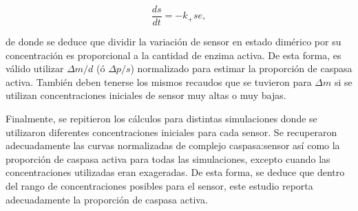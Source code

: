 \begin{equation}
    \frac{ds}{dt} = - k_+ se,
\end{equation}

\noindent de donde se deduce que dividir la variación de sensor en estado dimérico por su concentración es proporcional a la cantidad de enzima activa. De esta forma, es válido utilizar $\Delta m/d$ (ó $\Delta p/s$) normalizado para estimar la proporción de caspasa activa. También deben tenerse los mismos recaudos que se tuvieron para $\Delta m$ si se utilizan concentraciones iniciales de sensor muy altas o muy bajas.

Finalmente, se repitieron los cálculos para distintas simulaciones donde se utilizaron diferentes concentraciones iniciales para cada sensor. Se recuperaron adecuadamente las curvas normalizadas de complejo caspasa:sensor así como la proporción de caspasa activa para todas las simulaciones, excepto cuando las concentraciones utilizadas eran exageradas. De esta forma, se deduce que dentro del rango de concentraciones posibles para el sensor, este estudio reporta adecuadamente la proporción de caspasa activa.
